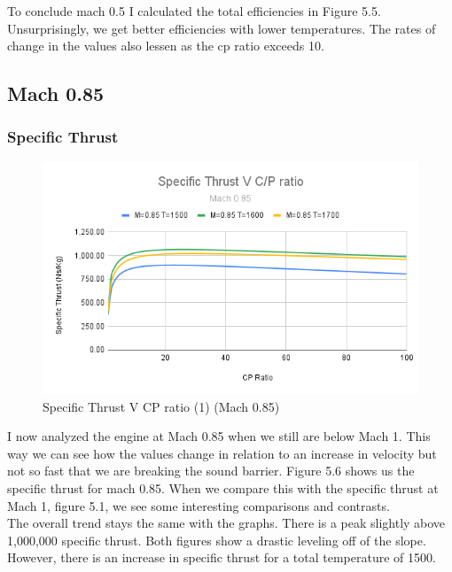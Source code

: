 \documentclass[12pt]{report}
\begin{document}
To conclude mach 0.5 I calculated the total efficiencies in Figure 5.5. Unsurprisingly, we get better efficiencies with lower temperatures. The rates of change in the values also lessen as the cp ratio exceeds 10.

\subsection{Mach 0.85}

\subsubsection{Specific Thrust}
\begin{figure}[H]
    \centering
    \includegraphics[width=15.5 cm]{Specific Thrust V C_P ratio (Mach 0.85).png}
    \caption{Specific Thrust V CP ratio (1) (Mach 0.85)}
    \label{fig:Specific Thrust V C_P ratio (1) (Mach 0.85)}
\end{figure}

I now analyzed the engine at Mach 0.85 when we still are below Mach 1.  This way we can see how the values change in relation to an increase in velocity but not so fast that we are breaking the sound barrier. Figure 5.6 shows us the specific thrust for mach 0.85. When we compare this with the specific thrust at Mach 1, figure 5.1, we see some interesting comparisons and contrasts.\\

The overall trend stays the same with the graphs. There is a peak slightly above 1,000,000 specific thrust. Both figures show a drastic leveling off of the slope. However, there is an increase in specific thrust for a total temperature of 1500.\\
\end{document}
